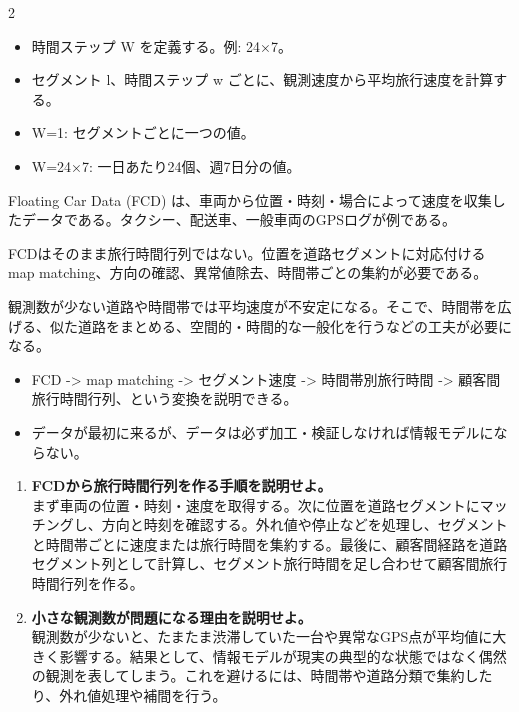 \clearpage
{}
\begin{multicols}{2}\footnotesize\raggedcolumns
{}
\begin{itemize}
\item 時間ステップ W を定義する。例: 24×7。
\item セグメント l、時間ステップ w ごとに、観測速度から平均旅行速度を計算する。
\item W=1: セグメントごとに一つの値。
\item W=24×7: 一日あたり24個、週7日分の値。
\end{itemize}
Floating Car Data (FCD) は、車両から位置・時刻・場合によって速度を収集したデータである。タクシー、配送車、一般車両のGPSログが例である。\par

FCDはそのまま旅行時間行列ではない。位置を道路セグメントに対応付ける map matching、方向の確認、異常値除去、時間帯ごとの集約が必要である。\par

観測数が少ない道路や時間帯では平均速度が不安定になる。そこで、時間帯を広げる、似た道路をまとめる、空間的・時間的な一般化を行うなどの工夫が必要になる。\par
{}
\begin{itemize}
\item FCD -> map matching -> セグメント速度 -> 時間帯別旅行時間 -> 顧客間旅行時間行列、という変換を説明できる。
\item データが最初に来るが、データは必ず加工・検証しなければ情報モデルにならない。
\end{itemize}
\begin{enumerate}
\item \textbf{FCDから旅行時間行列を作る手順を説明せよ。}\\まず車両の位置・時刻・速度を取得する。次に位置を道路セグメントにマッチングし、方向と時刻を確認する。外れ値や停止などを処理し、セグメントと時間帯ごとに速度または旅行時間を集約する。最後に、顧客間経路を道路セグメント列として計算し、セグメント旅行時間を足し合わせて顧客間旅行時間行列を作る。
\item \textbf{小さな観測数が問題になる理由を説明せよ。}\\観測数が少ないと、たまたま渋滞していた一台や異常なGPS点が平均値に大きく影響する。結果として、情報モデルが現実の典型的な状態ではなく偶然の観測を表してしまう。これを避けるには、時間帯や道路分類で集約したり、外れ値処理や補間を行う。
\end{enumerate}
\end{multicols}

